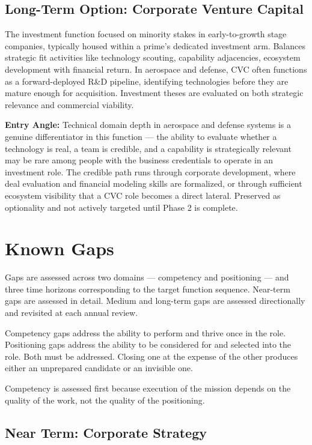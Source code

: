 \documentclass{article}
\begin{document}
\newpage
\subsection{Long-Term Option: Corporate Venture Capital} 

The investment function focused on minority stakes in early-to-growth stage companies, typically housed within 
a prime's dedicated investment arm. Balances strategic fit activities like technology scouting, capability 
adjacencies, ecosystem development with financial return. In aerospace and defense, CVC often functions 
as a forward-deployed R\&D pipeline, identifying technologies before they are mature enough for acquisition. 
Investment theses are evaluated on both strategic relevance and commercial viability.

\textbf{Entry Angle:} Technical domain depth in aerospace and defense systems is a genuine differentiator in this function --- the
ability to evaluate whether a technology is real, a team is credible, and a capability is strategically relevant may be
rare among people with the business credentials to operate in an investment role. The credible path runs through 
corporate development, where deal evaluation and financial modeling skills are formalized, or through sufficient 
ecosystem visibility that a CVC role becomes a direct lateral. 
Preserved as optionality and not actively targeted until Phase 2 is complete.

\newpage

\section{Known Gaps}

Gaps are assessed across two domains --- competency and positioning --- and three time horizons corresponding 
to the target function sequence. Near-term gaps are assessed in detail. Medium and long-term gaps are 
assessed directionally and revisited at each annual review.

Competency gaps address the ability to perform and thrive once in the role. Positioning gaps address the ability to be considered for
and selected into the role. Both must be addressed. Closing one at the expense of the other produces either an unprepared candidate
or an invisible one.

Competency is assessed first because execution of the mission depends on the quality of the work, not the quality of the positioning.

\subsection{Near Term: Corporate Strategy}
\end{document}

